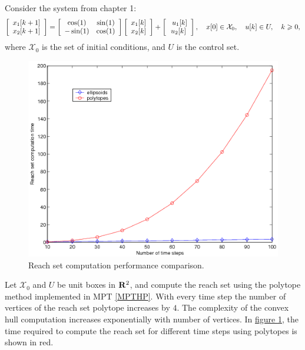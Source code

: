 \documentclass[letterpaper,10pt,english]{sphinxmanual}
\begin{document}
Consider the system from chapter 1:
\begin{gather}
\begin{split}\left[\begin{array}{c}
x_1[k+1]\\
x_2[k+1]\end{array}\right] = \left[\begin{array}{cc}
\cos(1) & \sin(1)\\
-\sin(1) & \cos(1)\end{array}\right]\left[\begin{array}{c}
x_1[k]\\
x_2[k]\end{array}\right] + \left[\begin{array}{c}\
u_1[k]\\
u_2[k]\end{array}\right], ~~~ x[0]\in{\mathcal X}_0, ~~~ u[k]\in U, ~~~ k\geqslant0,\end{split}\notag
\end{gather}
where ${\mathcal X}_0$ is the set of initial conditions, and
$U$ is the control set.
\begin{figure}[htbp]
\centering
\capstart

\includegraphics[width=0.500\linewidth]{chapter06_section01_ellpoly.png}
\caption{Reach set computation performance comparison.}\label{chap_examples:ellpolyfig}\end{figure}

Let ${\mathcal X}_0$ and $U$ be unit boxes in
${\bf R}^2$, and compute the reach set using the polytope method
implemented in MPT {\hyperref[chap_install:mpthp]{{[}MPTHP{]}}}. With every
time step the number of vertices of the reach set polytope increases by
$4$. The complexity of the convex hull computation increases
exponentially with number of vertices. In \hyperref[chap_examples:ellpolyfig]{figure  \ref*{chap_examples:ellpolyfig}}, the time
required to compute the reach set for different time steps using
polytopes is shown in red.
\end{document}
